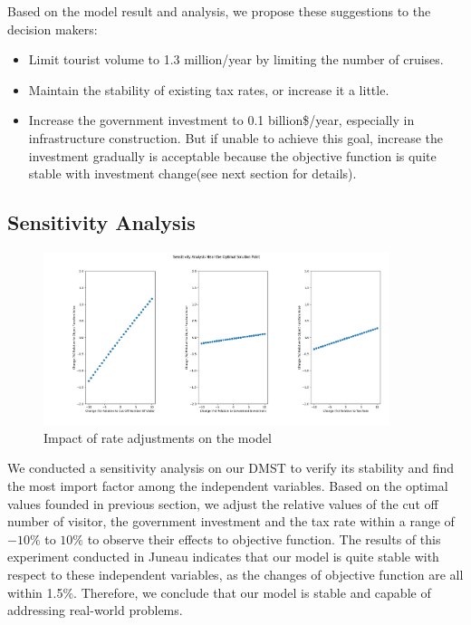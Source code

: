 \documentclass{mcmthesis}
\begin{document}
Based on the model result and analysis, we propose these suggestions to the decision makers:
\begin{itemize}
  \item Limit tourist volume to 1.3 million/year by limiting the number of cruises.
  \item Maintain the stability of existing tax rates, or increase it a little.
  \item Increase the government investment to 0.1 billion\$/year, especially in infrastructure construction.
  But if unable to achieve this goal, increase the investment gradually is acceptable because the objective function
  is quite stable with investment change(see next section for details).
\end{itemize}

\subsection{Sensitivity Analysis}
\begin{figure}[H]
  \centering
  \includegraphics[width=0.9\textwidth]{figures/sensitivity.png}
  \caption{Impact of rate adjustments on the model}
  \label{Fig.xxxxx}
\end{figure}

We conducted a sensitivity analysis on our DMST to verify its stability and find the most import factor among 
the independent variables. Based on the optimal values founded in previous section, we adjust the relative values of 
the cut off number of visitor, the government investment and the tax rate within a range of $-10\%$ to $10\%$
to observe their effects to objective function. The results of this experiment conducted in Juneau indicates that 
our model is quite stable with respect to these independent variables, as the changes of objective function are all 
within 1.5\%. Therefore, we conclude that our model is stable and capable of addressing real-world problems.
\end{document}
